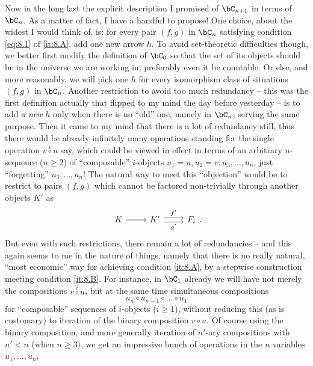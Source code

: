 \label{sec:10}%
Now in the long last the explicit description I promised of $\bC_{n+1}$
in terms of $\bC_n$. As a matter of fact, I have a handful
to propose! One choice, about the widest I would think of, is: for
every pair $(f,g)$ in $\bC_n$ satisfying condition \eqref{eq:8.1}
of \ref{it:8.A}, add one new arrow $h$. To avoid set-theoretic
difficulties though, we better first modify the definition of $\bC_0$
so that the set of its objects should be in the universe we are
working in, preferably even it be countable. Or else, and more
reasonably, we will pick one $h$ for every isomorphism class of
situations $(f,g)$ in $\bC_n$. Another restriction to avoid too
much redundancy -- this was the first definition actually that flipped
to my mind the day before yesterday -- is to add a \emph{new} $h$ only
when there is no ``old'' one, namely in $\bC_n$, serving the same
purpose. Then it came to my mind that there is a lot of redundancy
still, thus there would be already infinitely many
operations standing for the single operation $v \overset{i}{\circ} u$
say, which could be viewed in effect in terms of an arbitrary
$n$-sequence ($n\ge2$) of ``composable'' $i$-objects $u_1=u, u_2=v,
u_3, \dots, u_n$, just ``forgetting'' $u_3, \dots, u_n$! The natural way to meet this ``objection'' would be
to restrict to pairs $(f,g)$ which cannot be factored non-trivially
through another objects $K'$ as
\[\begin{tikzcd}
  K \ar[r] & K' \ar[r, shift left, "f'"] \ar[r, shift right, swap,
  "g'"] & F_i \end{tikzcd}.\]
But even with such restrictions, there remain a lot of redundancies --
and this again seems to me in the nature of things, namely that there
is no really natural, ``most economic'' way for achieving condition
\ref{it:8.A}, by a stepwise construction meeting condition
\ref{it:8.B}. For instance, in $\bC_1$ already we will have not
merely the compositions $v \overset{i}{\circ} u$, but at the same time
simultaneous compositions
\begin{equation}
  \label{eq:10.star}
  u_n \circ u_{n-1} \circ \dots \circ u_1 \tag{*}
\end{equation}
for ``composable'' sequences of $i$-objects ($i\ge1$), without
reducing this (as is customary) to iteration of the binary composition
$v \circ u$.
Of course using the binary composition, and more generally iteration
of $n'$-ary compositions with $n'<n$ (when $n\ge3)$, we get an
impressive bunch of operations in the $n$ variables $u_1, \dots, u_n$,

